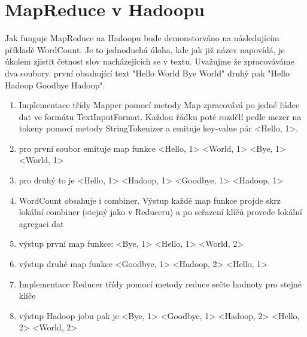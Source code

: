 \documentclass[thesis=M,czech]{FITthesis}[2012/06/26]
\begin{document}
\section{MapReduce v Hadoopu}
Jak funguje MapReduce na Hadoopu bude demonstorváno na následujícím příkladě WordCount. Je to jednoduchá úloha, kde jak již název napovídá, je úkolem zjistit četnost slov nacházejících se v textu. Uvažujme že zpracováváme dva soubory. první obsahující text "Hello World Bye World"  druhý pak "Hello Hadoop Goodbye Hadoop".
\begin{enumerate}
\item Implementace třídy Mapper pomocí metody Map zpracovává po jedné řádce dat ve formátu TextInputFormat. Každou řádku poté rozdělí pedle mezer na tokeny pomocí metody StringTokenizer a emituje key-value pár <Hello, 1>.
\item pro první soubor emituje map funkce <Hello, 1> <World, 1> <Bye, 1> <World, 1>
\item pro druhý to je <Hello, 1> <Hadoop, 1> <Goodbye, 1> <Hadoop, 1>
\item WordCount obsahuje i combiner. Výstup každé map funkce projde skrz lokální combiner (stejný jako v Reduceru) a po seřazení  klíčů provede lokální agregaci dat
\item výstup první map funkce: <Bye, 1> <Hello, 1> <World, 2>
\item výstup druhé map funkce  <Goodbye, 1> <Hadoop, 2> <Hello, 1>
\item Implementace Reducer třídy pomocí metody reduce sečte hodnoty pro stejné klíče
\item výstup Hadoop jobu pak je <Bye, 1> <Goodbye, 1> <Hadoop, 2> <Hello, 2> <World, 2>
\end{enumerate}
\pagebreak
\end{document}
